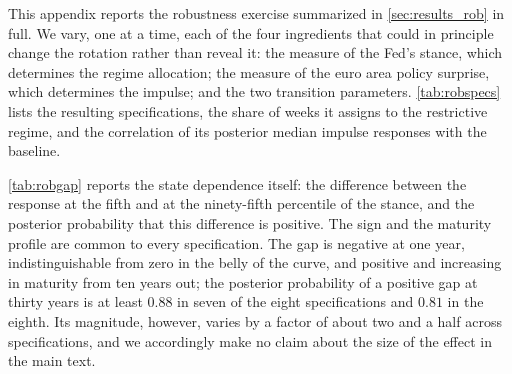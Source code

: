 

This appendix reports the robustness exercise summarized in \autoref{sec:results_rob} in full. We vary, one at a time, each of the four ingredients that could in principle change the rotation rather than reveal it: the measure of the Fed's stance, which determines the regime allocation; the measure of the euro area policy surprise, which determines the impulse; and the two transition parameters. \autoref{tab:robspecs} lists the resulting specifications, the share of weeks it assigns to the restrictive regime, and the correlation of its posterior
median impulse responses with the baseline.

\begin{table}[!htpb]
\caption{Robustness specifications.\label{tab:robspecs}}
\centering \footnotesize
\resizebox{\textwidth}{!}{}
\caption*{\footnotesize \textit{Notes:} Each specification alters exactly one ingredient of the baseline and leaves the remainder unchanged. The restrictive share is the fraction of weeks with posterior mean $S_t > 0.5$. The final column is the correlation between the posterior median yield responses of the specification and those of the baseline, taken across all maturities, stance percentiles and horizons. Note that the correlation is not directly comparable for the specification that uses the \cite{jarocinski2020deconstructing} shocks, whose surprise series is a different object with a different scale.}
\end{table}

\autoref{tab:robgap} reports the state dependence itself: the difference between the response at the fifth and at the ninety-fifth percentile of the stance, and the posterior probability that this difference is positive. The sign and the maturity profile are common to every specification. The
gap is negative at one year, indistinguishable from zero in the belly of the curve, and positive
and increasing in maturity from ten years out; the posterior probability of a positive gap at thirty years is at least $0.88$ in seven of the eight specifications and $0.81$ in the eighth. Its magnitude, however, varies by a factor of about two and a half across specifications, and we accordingly make no claim about the size of the effect in the main text.

\begin{table}[!htpb]
\caption{The state-dependence gap across specifications.\label{tab:robgap}}
\centering \footnotesize
\resizebox{\textwidth}{!}{}
\caption*{\footnotesize \textit{Notes:} The gap is the one-week-ahead response at the fifth percentile of the Fed's stance less the response at the ninety-fifth percentile, in basis points per one standard deviation euro area surprise, computed draw by draw. $P(\text{gap}>0)$ is the share of posterior draws in which the gap is positive. Because the surprise is standardized within each specification, magnitudes are comparable across all columns except \texttt{jk}, whose underlying series has a standard deviation of $3.5$ rather than $5.7$ basis points; for that column the sign and the maturity profile are informative but the level is not.}
\end{table}

